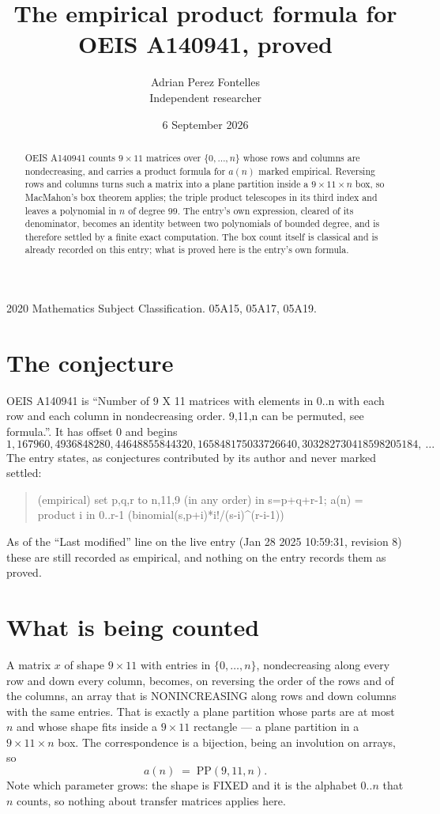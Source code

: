 \documentclass[11pt,a4paper]{article}
\title{The empirical product formula for OEIS A140941, proved}
\author{Adrian Perez Fontelles\\ \small Independent researcher}
\date{6 September 2026}
\theoremstyle{plain}
\theoremstyle{definition}
\begin{document}
\maketitle

\begin{abstract}
OEIS A140941 counts $9\times11$ matrices over $\{0,\dots,n\}$ whose rows and columns are
nondecreasing, and carries a product formula for $a(n)$ marked empirical. Reversing rows and
columns turns such a matrix into a plane partition inside a $9\times11\times n$ box, so
MacMahon's box theorem applies; the triple product telescopes in its third index and leaves a
polynomial in $n$ of degree $99$. The entry's own expression, cleared of its denominator,
becomes an identity between two polynomials of bounded degree, and is therefore settled by a
finite exact computation. The box count itself is classical and is already recorded on this
entry; what is proved here is the entry's own formula.
\end{abstract}

\noindent\small 2020 Mathematics Subject Classification. 05A15, 05A17, 05A19.\normalsize

\section{The conjecture}

OEIS A140941 is ``Number of 9 X 11 matrices with elements in 0..n with each row and each column in nondecreasing order. 9,11,n can be permuted, see formula.''. It has offset $0$ and begins
\[
1, 167960, 4936848280, 44648855844320, 165848175033726640, 303282730418598205184,\ \dots
\]
The entry states, as conjectures contributed by its author and never marked settled:
\begin{quote}
(empirical) set p,q,r to n,11,9 (in any order) in s=p+q+r-1; a(n) = product {i in 0..r-1} (binomial(s,p+i)*i!/(s-i)\^{}(r-i-1))

\end{quote}
As of the ``Last modified'' line on the live entry (Jan 28 2025 10:59:31, revision 8) these are still
recorded as empirical, and nothing on the entry records them as proved.

\section{What is being counted}

A matrix $x$ of shape $9\times11$ with entries in $\{0,\dots,n\}$, nondecreasing along
every row and down every column, becomes, on reversing the order of the rows and of the
columns, an array that is NONINCREASING along rows and down columns with the same entries. That
is exactly a plane partition whose parts are at most $n$ and whose shape fits inside a
$9\times11$ rectangle --- a plane partition in a $9\times11\times n$ box. The
correspondence is a bijection, being an involution on arrays, so
\[
a(n)\;=\;\mathrm{PP}(9,11,n).
\]
Note which parameter grows: the shape is FIXED and it is the alphabet $0..n$ that $n$ counts,
so nothing about transfer matrices applies here.
\end{document}
